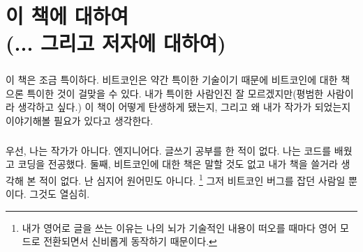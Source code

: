 
\def\bitcoinB{\leavevmode
	{\setbox0=\hbox{\textsf{B}}%
		\dimen0\ht0 \advance\dimen0 0.2ex
		\ooalign{\hfil \box0\hfil\cr
			\hfil\vrule height \dimen0 depth.2ex\hfil\cr
		}%
	}%
}

\chapter*{이 책에 대하여 \\ (... 그리고 저자에 대하여)}


\paragraph{}
이 책은 조금 특이하다. 
비트코인은 약간 특이한 기술이기 때문에 비트코인에 대한 책으론 특이한 것이 걸맞을 수 있다. 
내가 특이한 사람인진 잘 모르겠지만(평범한 사람이라 생각하고 싶다.) 
이 책이 어떻게 탄생하게 됐는지, 그리고 왜 내가 작가가 되었는지 이야기해볼 필요가 있다고 생각한다.


\paragraph{}
우선, 나는 작가가 아니다. 엔지니어다. 글쓰기 공부를 한 적이 없다. 나는 코드를 배웠고 코딩을 전공했다. 
둘째, 비트코인에 대한 책은 말할 것도 없고 내가 책을 쓸거라 생각해 본 적이 없다. 난 심지어 원어민도 아니다. 
\footnote{내가 영어로 글을 쓰는 이유는 나의 뇌가 기술적인 내용이 떠오를 때마다 영어 모드로 전환되면서 신비롭게 동작하기 때문이다.}
그저 비트코인 버그를 잡던 사람일 뿐이다. 그것도 열심히.



